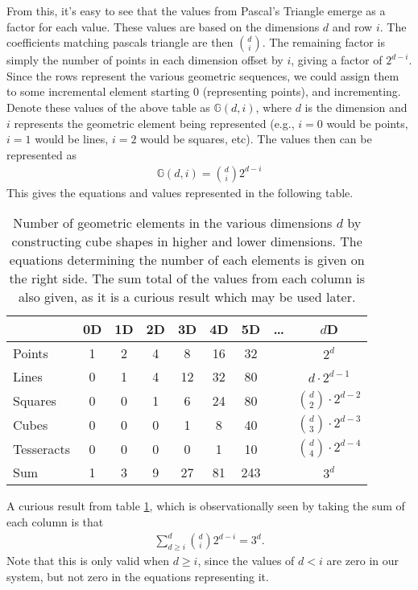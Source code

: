 From this, it's easy to see that the values from Pascal's Triangle emerge as a factor for each value. These values are based on the dimensions $d$ and row $i$. The coefficients matching pascals triangle are then $\binom{d}{i}$. The remaining factor is simply the number of points in each dimension offset by $i$, giving a factor of $2^{d-i}$. Since the rows represent the various geometric sequences, we could assign them to some incremental element starting 0 (representing points), and incrementing. Denote these values of the above table as $\mathbb{G}(d,i)$, where $d$ is the dimension and $i$ represents the geometric element being represented (e.g., $i=0$ would be points, $i=1$ would be lines, $i=2$ would be squares, etc). The values then can be represented as
\begin{align}
	\mathbb{G}(d, i) = \binom{d}{i} 2^{d-i}
\end{align}
This gives the equations and values represented in the following table.
\begin{table}[htbp]
	\centering
	\begin{tabular}{lcccccccc}
		\toprule
		& 0D & 1D & 2D & 3D & 4D & 5D &\dots& \(d\)D \\
		\midrule
		Points     & 1  & 2  & 4  & 8  & 16 & 32 && \(2^d\) \\
		Lines      & 0  & 1  & 4  & 12 & 32 & 80 && \(d \cdot 2^{d-1}\) \\
		Squares    & 0  & 0  & 1  & 6  & 24 & 80 && \(\binom{d}{2} \cdot 2^{d-2}\) \\
		Cubes      & 0  & 0  & 0  & 1  & 8  & 40 && \(\binom{d}{3} \cdot 2^{d-3}\) \\
		Tesseracts & 0  & 0  & 0  & 0  & 1  & 10 && \(\binom{d}{4} \cdot 2^{d-4}\) \\
		\bottomrule
		Sum        & 1  & 3  & 9  & 27  & 81 & 243 && \(3^d\) \\
	\end{tabular}
	\caption{Number of geometric elements in the various dimensions $d$ by constructing cube shapes in higher and lower dimensions. The equations determining the number of each elements is given on the right side. The sum total of the values from each column is also given, as it is a curious result which may be used later.}
	\label{tab:hypercube_elements}
\end{table}

A curious result from table \ref{tab:hypercube_elements}, which is observationally seen by taking the sum of each column is that
\begin{align}
\sum_{d\geq i}^{d}\binom{d}{i}2^{d-i} = 3^d.
\end{align}
Note that this is only valid when $d\geq i$, since the values of $d<i$ are zero in our system, but not zero in the equations representing it.















